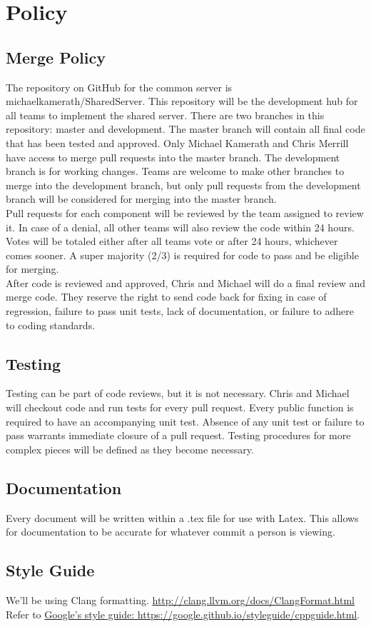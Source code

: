 \section*{Policy}
\subsection*{Merge Policy}
The repository on GitHub for the common server is michaelkamerath/SharedServer. This repository will be the development hub for all teams to implement the shared server. There are two branches in this repository: master and development. The master branch will contain all final code that has been tested and approved. Only Michael Kamerath and Chris Merrill have access to merge pull requests into the master branch. The development branch is for working changes. Teams are welcome to make other branches to merge into the development branch, but only pull requests from the development branch will be considered for merging into the master branch.\\
Pull requests for each component will be reviewed by the team assigned to review it. In case of a denial, all other teams will also review the code within 24 hours. Votes will be totaled either after all teams vote or after 24 hours, whichever comes sooner. A super majority (2/3) is required for code to pass and be eligible for merging.\\
After code is reviewed and approved, Chris and Michael will do a final review and merge code. They reserve the right to send code back for fixing in case of regression, failure to pass unit tests, lack of documentation, or failure to adhere to coding standards.
\subsection*{Testing}
Testing can be part of code reviews, but it is not necessary. Chris and Michael will checkout code and run tests for every pull request. Every public function is required to have an accompanying unit test. Absence of any unit test or failure to pass warrants immediate closure of a pull request. Testing procedures for more complex pieces will be defined as they become necessary.
\subsection*{Documentation}
Every document will be written within a .tex file for use with Latex. This allows for documentation to be accurate for whatever commit a person is viewing.
\subsection*{Style Guide}
We'll be using Clang formatting. \href{http://clang.llvm.org/docs/ClangFormat.html}{http://clang.llvm.org/docs/ClangFormat.html} \\
Refer to \href{https://google.github.io/styleguide/cppguide.html}{Google's style guide: https://google.github.io/styleguide/cppguide.html}.